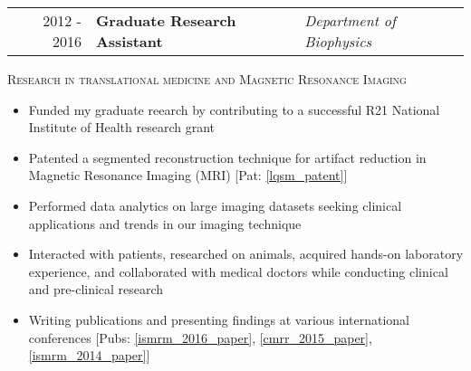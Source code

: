 
\begin{minipage}{\textwidth}
	\begin{tabular}{r|ll}
		2012 - 2016 & \textbf{Graduate Research Assistant} & \textit{Department of Biophysics}  \\
	\end{tabular}
\end{minipage}

\begin{center}
	\begin{minipage}{0.9\textwidth}
		\begin{center}
			\textsc{\Large Research in translational medicine and Magnetic Resonance Imaging} \vspace{2mm}
		\end{center}
	\end{minipage}
\end{center}

\begin{minipage}{\textwidth}
	\begin{center}
		\begin{itemize}
			\item Funded my graduate reearch by contributing to a successful R21 National Institute of Health research grant
			\item Patented a segmented reconstruction technique for artifact reduction in Magnetic Resonance Imaging (MRI) [Pat: \ref{lqsm_patent}]
			\item Performed data analytics on large imaging datasets seeking clinical applications and trends in our imaging technique
			\item Interacted with patients, researched on animals, acquired hands-on laboratory experience, and collaborated with medical doctors while conducting clinical and pre-clinical research
			\item Writing publications and presenting findings at various international conferences [Pubs: \ref{ismrm_2016_paper}, \ref{cmrr_2015_paper}, \ref{ismrm_2014_paper}]
	\end{itemize}
	\end{center}
\end{minipage}

